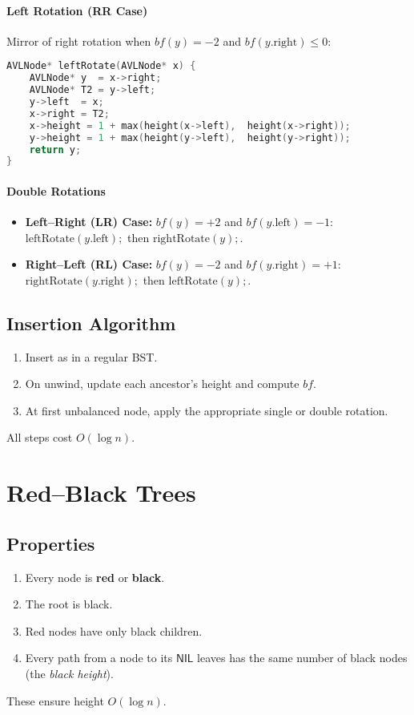 \documentclass[12pt]{article}
\begin{document}
\paragraph{Left Rotation (RR Case)}  
Mirror of right rotation when \(\mathit{bf}(y)=-2\) and \(\mathit{bf}(y.\mathrm{right})\le0\):
\begin{lstlisting}[language=C]
AVLNode* leftRotate(AVLNode* x) {
    AVLNode* y  = x->right;
    AVLNode* T2 = y->left;
    y->left  = x;
    x->right = T2;
    x->height = 1 + max(height(x->left),  height(x->right));
    y->height = 1 + max(height(y->left),  height(y->right));
    return y;
}
\end{lstlisting}

\paragraph{Double Rotations}
\begin{itemize}
  \item \textbf{Left–Right (LR) Case:} \(\mathit{bf}(y)=+2\) and \(\mathit{bf}(y.\mathrm{left})=-1\):
    \(\text{leftRotate}(y.\mathrm{left});\) then \(\text{rightRotate}(y);\).
  \item \textbf{Right–Left (RL) Case:} \(\mathit{bf}(y)=-2\) and \(\mathit{bf}(y.\mathrm{right})=+1\):
    \(\text{rightRotate}(y.\mathrm{right});\) then \(\text{leftRotate}(y);\).
\end{itemize}

\subsection*{Insertion Algorithm}
\begin{enumerate}
  \item Insert as in a regular BST.
  \item On unwind, update each ancestor’s height and compute \(\mathit{bf}\).
  \item At first unbalanced node, apply the appropriate single or double rotation.
\end{enumerate}
All steps cost \(O(\log n)\).

\newpage
\section{Red–Black Trees}
\subsection*{Properties}
\begin{enumerate}
  \item Every node is \textbf{red} or \textbf{black}.
  \item The root is black.
  \item Red nodes have only black children.
  \item Every path from a node to its \(\textsf{NIL}\) leaves has the same number of black nodes (the \emph{black height}).
\end{enumerate}
These ensure height \(O(\log n)\).
\end{document}
